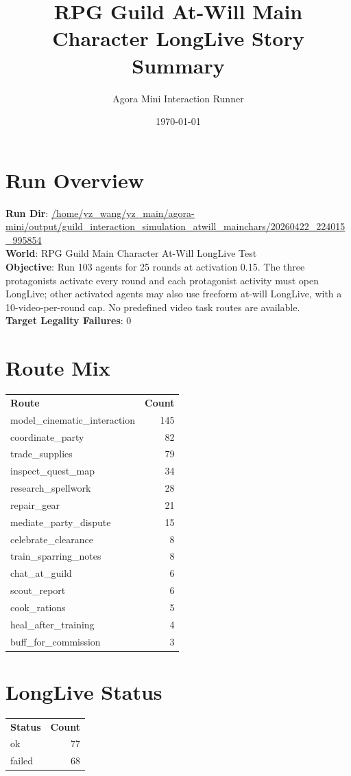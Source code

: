 \documentclass[11pt,a4paper]{article}
\title{RPG Guild At-Will Main Character LongLive Story Summary}
\author{Agora Mini Interaction Runner}
\date{\today}
\begin{document}
\maketitle
\tableofcontents

\section{Run Overview}
\textbf{Run Dir}: \url{/home/yz\_wang/yz\_main/agora-mini/output/guild\_interaction\_simulation\_atwill\_mainchars/20260422\_224015\_995854}\\
\textbf{World}: RPG Guild Main Character At-Will LongLive Test\\
\textbf{Objective}: Run 103 agents for 25 rounds at activation 0.15. The three protagonists activate every round and each protagonist activity must open LongLive; other activated agents may also use freeform at-will LongLive, with a 10-video-per-round cap. No predefined video task routes are available.\\
\textbf{Target Legality Failures}: 0\\

\section{Route Mix}
\begin{longtable}{lr}
\textbf{Route} & \textbf{Count}\\
model\_cinematic\_interaction & 145 \\
coordinate\_party & 82 \\
trade\_supplies & 79 \\
inspect\_quest\_map & 34 \\
research\_spellwork & 28 \\
repair\_gear & 21 \\
mediate\_party\_dispute & 15 \\
celebrate\_clearance & 8 \\
train\_sparring\_notes & 8 \\
chat\_at\_guild & 6 \\
scout\_report & 6 \\
cook\_rations & 5 \\
heal\_after\_training & 4 \\
buff\_for\_commission & 3 \\
\end{longtable}

\section{LongLive Status}
\begin{longtable}{lr}
\textbf{Status} & \textbf{Count}\\
ok & 77 \\
failed & 68 \\
\end{longtable}
\end{document}
